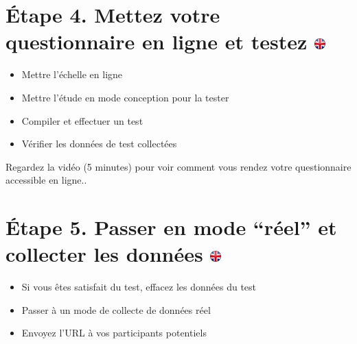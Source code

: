 \documentclass[
]{book}
\providecommand{\tightlist}{%
  \setlength{\itemsep}{0pt}\setlength{\parskip}{0pt}}
\begin{document}
\hypertarget{uxe9tape-4.-mettez-votre-questionnaire-en-ligne-et-testez}{%
\section[Étape 4. Mettez votre questionnaire en ligne et testez
]{\texorpdfstring{Étape 4. Mettez votre questionnaire en ligne et testez
\href{https://www.psytoolkit.org/lessons/questionnaire-project.html\#_step_4_bring_your_scale_online_and_test}{\protect\includegraphics{img/ukflag.png}}}{Étape 4. Mettez votre questionnaire en ligne et testez }}\label{uxe9tape-4.-mettez-votre-questionnaire-en-ligne-et-testez}}

\begin{itemize}
\tightlist
\item
  Mettre l'échelle en ligne
\item
  Mettre l'étude en mode conception pour la tester
\item
  Compiler et effectuer un test
\item
  Vérifier les données de test collectées
\end{itemize}

Regardez la vidéo (5 minutes) pour voir comment vous rendez votre
questionnaire accessible en ligne..

\hypertarget{uxe9tape-5.-passer-en-mode-ruxe9el-et-collecter-les-donnuxe9es}{%
\section[Étape 5. Passer en mode ``réel'' et collecter les données
]{\texorpdfstring{Étape 5. Passer en mode ``réel'' et collecter les
données
\href{https://www.psytoolkit.org/lessons/questionnaire-project.html\#_step_5_switch_to_real_mode_and_collect_data}{\protect\includegraphics{img/ukflag.png}}}{Étape 5. Passer en mode ``réel'' et collecter les données }}\label{uxe9tape-5.-passer-en-mode-ruxe9el-et-collecter-les-donnuxe9es}}

\begin{itemize}
\tightlist
\item
  Si vous êtes satisfait du test, effacez les données du test
\item
  Passer à un mode de collecte de données réel
\item
  Envoyez l'URL à vos participants potentiels
\end{itemize}
\end{document}
